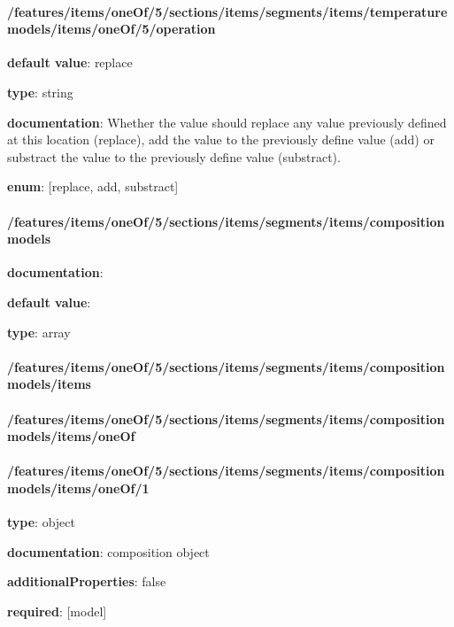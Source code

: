 \begin{itemized}
\end{itemized}\paragraph{/features/items/oneOf/5/sections/items/segments/items/temperature models/items/oneOf/5/operation} \begin{itemized}
\item {\bf default value}: replace
\item {\bf type}: string
\item {\bf documentation}: Whether the value should replace any value previously defined at this location (replace), add the value to the previously define value (add) or substract the value to the previously define value (substract).
\item {\bf enum}: [replace, add, substract]\end{itemized}\paragraph{/features/items/oneOf/5/sections/items/segments/items/composition models} \begin{itemized}
\item {\bf documentation}: 
\item {\bf default value}: 
\item {\bf type}: array
\paragraph{/features/items/oneOf/5/sections/items/segments/items/composition models/items} \begin{itemized}
\end{itemized}\end{itemized}\paragraph{/features/items/oneOf/5/sections/items/segments/items/composition models/items/oneOf} \begin{itemized}
\end{itemized}\paragraph{/features/items/oneOf/5/sections/items/segments/items/composition models/items/oneOf/1} \begin{itemized}
\item {\bf type}: object
\item {\bf documentation}: composition object
\item {\bf additionalProperties}: false
\item {\bf required}: [model]\end{itemized}
